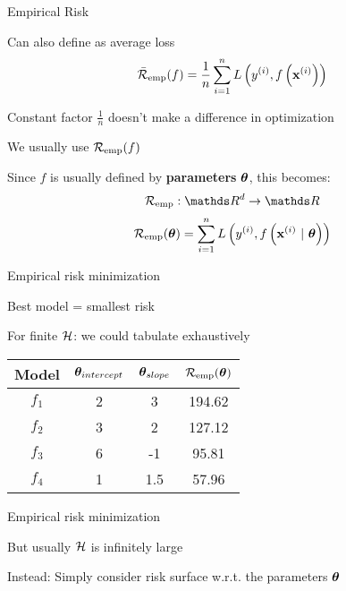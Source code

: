 \documentclass[11pt,compress,t,notes=noshow, xcolor=table]{beamer}
\begin{document}
\begin{framei}{Empirical Risk}
\item Can also define as average loss
$$
\bar{\mathcal{R}}_{\text{emp}}(f) = \frac{1}{n}\sum\limits_{i=1}^n L\left(y^{(i)}, f\left(\mathbf{x}^{(i)}\right)\right)
$$
\item Constant factor $\frac{1}{n}$ doesn't make a difference in optimization
\item We usually use $\mathcal{R}_{\text{emp}}(f)$ 
\item Since $f$ is usually defined by \textbf{parameters} $\bm{\theta}$, this becomes:
$$
\riske : \R^d \to \R
$$
$$
\mathcal{R}_{\text{emp}}(\bm{\theta}) = \sum\limits_{i=1}^n L\left(y^{(i)}, f\left(\mathbf{x}^{(i)} ~|~ \bm{\theta}\right)\right)
$$
\end{framei}


\begin{framei}{Empirical risk minimization}
\item Best model = smallest risk
\item For finite $\mathcal{H}$: we could tabulate exhaustively
\vfill
\begin{center}
\begin{tabular}{ c | c | c || c } %
Model & \(\displaystyle \bm{\theta}_{intercept} \) & \(\displaystyle \bm{\theta}_{slope} \) & \(\displaystyle \mathcal{R}_{\text{emp}}(\bm{\theta}) \) \\ 
\hline
\(\displaystyle f_1 \)   & 2 & 3 & 194.62 \\
\(\displaystyle f_2 \)   & 3 & 2 & 127.12 \\  
\(\displaystyle f_3 \)   & 6 & -1 & 95.81 \\
\rowcolor{lightgray}
\(\displaystyle f_4 \)   & 1 & 1.5 & 57.96 \\  
\end{tabular}
\end{center}
\end{framei}


\begin{framei}{Empirical risk minimization}
\item But usually $\mathcal{H}$ is infinitely large
\item Instead: Simply consider risk surface w.r.t. the parameters $\bm{\theta}$ 
\end{framei}
\end{document}
